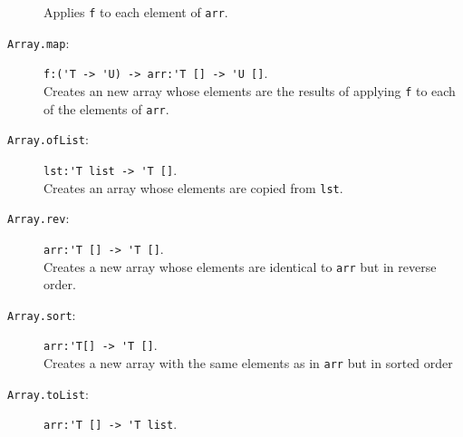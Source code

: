 \documentclass[springer.tex]{subfiles}
\begin{document}
\begin{description}
  Applies \lstinline{f} to each element of \lstinline{arr}.
\item[\texttt{Array.map}:] \lstinline{f:('T -> 'U) -> arr:'T [] -> 'U []}.~\\
  Creates an new array whose elements are the results of applying \lstinline{f} to each of the elements of \lstinline{arr}.
\item[\texttt{Array.ofList}:] \lstinline{lst:'T list -> 'T []}.~\\
  Creates an array whose elements are copied from \lstinline{lst}.
\item[\texttt{Array.rev}:] \lstinline{arr:'T [] -> 'T []}.~\\
  Creates a new array whose elements are identical to \lstinline{arr} but in reverse order.
\item[\texttt{Array.sort}:] \lstinline{arr:'T[] -> 'T []}.~\\
  Creates a new array with the same elements as in \lstinline{arr} but in sorted order %
\item[\texttt{Array.toList}:] \lstinline{arr:'T [] -> 'T list}.~\\

\end{description}
\end{document}
